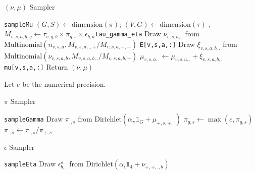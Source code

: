 \documentclass{article}
\newcommand{\code}[1]{\colorbox{light-gray}{\texttt{#1}}}
\begin{document}
\begin{algorithm}[H]
\caption{$(\nu,\mu)$ Sampler }\label{alg:desman_tau}
\begin{algorithmic}
\hfill\code{sampleMu}
\State $(G,S)\gets\mathrm{dimension}(\pi)$; $(V,G)\gets\mathrm{dimension}(\tau) $
,
\State $M_{v,s,a,b,g}\gets\tau_{v,g,b}\times\pi_{g,s}\times \epsilon_{b,a}${\hfill \code{tau\_gamma\_eta}}
\EndFor
{} 
            \State Draw $\nu_{v,s,a,.}$ from $\mathrm{Multinomial}(n_{v,s,a},M_{v,s,a,.,+}/M_{v,s,a,+,+})$
             \hfill\code{E[v,s,a,:]}
                \State Draw $\xi_{v,s,a,b,.}$ from $\mathrm{Multinomial}(\nu_{v,s,a,b},M_{v,s,a,b,.}/M_{v,s,a,b,+})$ 
                \State $\mu_{v,s,a,.}\gets \mu_{v,s,a,.}+\xi_{v,s,a,b,.}$\hfill\code{mu[v,s,a,:]}
            \EndFor    
        \EndFor
    \EndFor
\EndFor
\State Return $(\nu,\mu)$
\EndProcedure
\end{algorithmic}
\end{algorithm}



Let $e$ be the numerical precision.

\begin{algorithm}[H]
\caption{$\pi$ Sampler }\label{alg:desman_tau}
\begin{algorithmic}
\hfill\code{sampleGamma}
        \State Draw $\pi_{.,s}$ from
        $\mathrm{Dirichlet}(\alpha_\pi\mathds{1}_G+\mu_{+,s,+,.})$
    \EndFor
\State $\pi_{g,s}\gets\max(e,\pi_{g,s})$
    \EndFor
\State $\pi_{.,s}\gets\pi_{.,s}/\pi_{+,s}$
    \EndFor
\EndProcedure
\end{algorithmic}
\end{algorithm}


\begin{algorithm}[H]
\caption{$\epsilon$ Sampler }\label{alg:desman_tau}
\begin{algorithmic}
\hfill\code{sampleEta}
        \State Draw $\epsilon^\star_{b,.}$
        from $\mathrm{Dirichlet}\left(\alpha_\epsilon\mathds{1}_4+\nu_{+,+,.,b}\right)$
    \EndFor
\EndProcedure
\end{algorithmic}
\end{algorithm}
\end{document}
